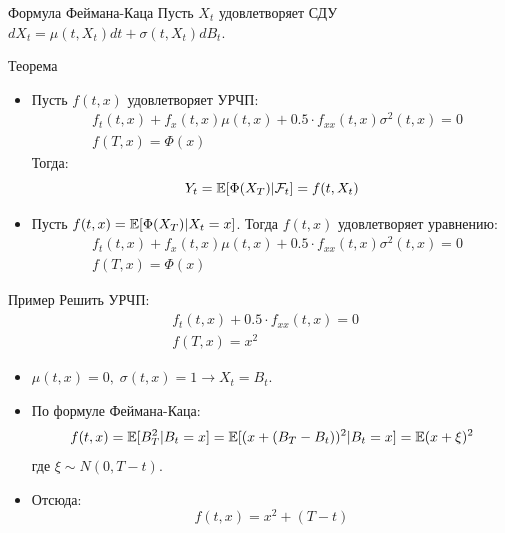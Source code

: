 \documentclass[aspectratio=169]{beamer}
\begin{document}
\begin{frame}{Формула Феймана-Каца}
    Пусть $X_t$ удовлетворяет СДУ $dX_t = \mu(t, X_t) dt + \sigma(t, X_t) dB_t$. 
    \begin{block}{Теорема}
    \begin{itemize}
        \item Пусть $f(t, x)$ удовлетворяет УРЧП:
        \begin{align*}
            &f_t(t, x) + f_x(t, x) \mu(t, x) + 0.5 \cdot f_{xx}(t, x) \sigma^2(t, x) = 0 \\
            &f(T, x) = \Phi(x)
        \end{align*} Тогда:
        $$
            Y_t = \mathbb{E}[\Phi(X_T) | \mathcal{F}_t] = f(t, X_t)
        $$

        \item Пусть $f(t, x) = \mathbb{E}[\Phi(X_T) | X_t = x]$. Тогда $f(t, x)$ удовлетворяет уравнению:
        \begin{align*}
            &f_t(t, x) + f_x(t, x) \mu(t, x) + 0.5 \cdot f_{xx}(t, x) \sigma^2(t, x) = 0 \\
            &f(T, x) = \Phi(x)
        \end{align*}

    \end{itemize}

    \end{block}
\end{frame}

\begin{frame}{Пример}
    Решить УРЧП:
    \begin{align*}
        &f_t(t, x) + 0.5 \cdot f_{xx}(t, x)  = 0 \\
        &f(T, x) = x^2
    \end{align*}

    \pause
    \begin{itemize}
        \item $\mu(t, x) = 0, \; \sigma(t, x) = 1 \to X_t = B_t$. 

        \item По формуле Феймана-Каца:
        $$
            f(t, x) = \mathbb{E}[B_T^2 | B_t = x] = \mathbb{E}[ (x + (B_T-B_t))^2 | B_t = x ] = \mathbb{E}(x+\xi)^2
        $$где $\xi \sim N(0, T-t)$.

        \item Отсюда:
        $$
            f(t, x) = x^2 + (T-t)
        $$
    \end{itemize}
\end{frame}
\end{document}
